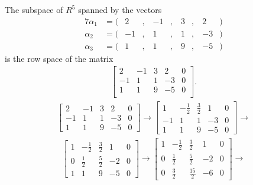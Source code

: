 \documentclass[12pt]{article}
\begin{document}
\begin{enumerate}
      The subspace of $R^5$ spanned by the vectors
      \begin{alignat*}{7}
        \alpha_1 &= (&2&,\ &-1&,\ &3&,\ &2&)\\
        \alpha_2 &= (&-1&,\ &1&,\ &1&,\ &-3&)\\
        \alpha_3 &= (&1&,\ &1&,\ &9&,\ &-5&)
      \end{alignat*}
      is the row space of the matrix
      \begin{align*}
        \begin{bmatrix}
          2  & -1 & 3 & 2  & 0\\
          -1 & 1  & 1 & -3 & 0\\
          1  & 1  & 9 & -5 & 0\\
        \end{bmatrix}.
      \end{align*}
      \begin{align*}
        \begin{bmatrix}
          2 & -1 & 3 & 2 & 0\\
          -1 & 1 & 1 & -3 & 0\\
          1 & 1 & 9 & -5 & 0
        \end{bmatrix}
        \xrightarrow{}
        \begin{bmatrix}
          1 & -\frac{1}{2} & \frac{3}{2} & 1 & 0\\
          -1 & 1 & 1 & -3 & 0\\
          1 & 1 & 9 & -5 & 0
        \end{bmatrix}
        \xrightarrow{}
      \end{align*}
      \begin{align*}
        \begin{bmatrix}
          1 & -\frac{1}{2} & \frac{3}{2} & 1 & 0\\
          0 & \frac{1}{2} & \frac{5}{2} & -2 & 0\\
          1 & 1 & 9 & -5 & 0
        \end{bmatrix}
        \xrightarrow{}
        \begin{bmatrix}
          1 & -\frac{1}{2} & \frac{3}{2} & 1 & 0\\
          0 & \frac{1}{2} & \frac{5}{2} & -2 & 0\\
          0 & \frac{3}{2} & \frac{15}{2} & -6 & 0
        \end{bmatrix}
        \xrightarrow{}
      \end{align*}
      \begin{align*}

\end{align*}
\end{enumerate}
\end{document}

